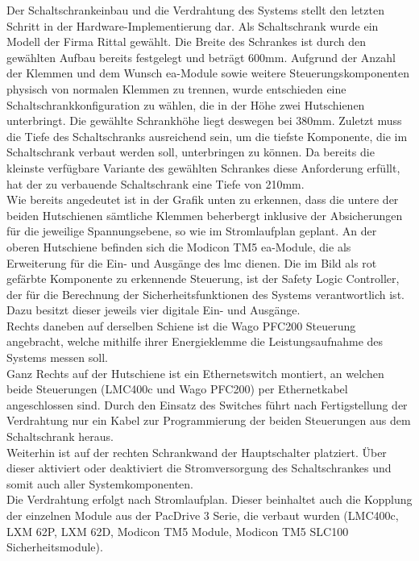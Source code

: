 \documentclass[../../../Bachelorarbeit.tex]{subfiles}
\begin{document}
Der Schaltschrankeinbau und die Verdrahtung des Systems stellt den letzten Schritt in der Hardware-Implementierung dar. Als Schaltschrank wurde ein Modell der Firma Rittal gewählt. Die Breite des Schrankes ist durch den gewählten Aufbau bereits festgelegt und beträgt 600\si{\mm}. Aufgrund der Anzahl der Klemmen und dem Wunsch \acs{ea}-Module sowie weitere Steuerungskomponenten physisch von normalen Klemmen zu trennen, wurde entschieden eine Schaltschrankkonfiguration zu wählen, die in der Höhe zwei Hutschienen unterbringt. Die gewählte Schrankhöhe liegt deswegen bei 380\si{\mm}. Zuletzt muss die Tiefe des Schaltschranks ausreichend sein, um die tiefste Komponente, die im Schaltschrank verbaut werden soll, unterbringen zu können. Da bereits die kleinste verfügbare Variante des gewählten Schrankes diese Anforderung erfüllt, hat der zu verbauende Schaltschrank eine Tiefe von 210\si{\mm}.\\
Wie bereits angedeutet ist in der Grafik unten zu erkennen, dass die untere der beiden Hutschienen sämtliche Klemmen beherbergt inklusive der Absicherungen für die jeweilige Spannungsebene, so wie im Stromlaufplan geplant. An der oberen Hutschiene befinden sich die Modicon TM5 \acs{ea}-Module, die als Erweiterung für die Ein- und Ausgänge des \acs{lmc} dienen. Die im Bild als rot gefärbte Komponente zu erkennende Steuerung, ist der Safety Logic Controller, der für die Berechnung der Sicherheitsfunktionen des Systems verantwortlich ist. Dazu besitzt dieser jeweils vier digitale Ein- und Ausgänge.\\
Rechts daneben auf derselben Schiene ist die Wago PFC200 Steuerung angebracht, welche mithilfe ihrer Energieklemme die Leistungsaufnahme des Systems messen soll.\\
Ganz Rechts auf der Hutschiene ist ein Ethernetswitch montiert, an welchen beide Steuerungen (LMC400c und Wago PFC200) per Ethernetkabel angeschlossen sind. Durch den Einsatz des Switches führt nach Fertigstellung der Verdrahtung nur ein Kabel zur Programmierung der beiden Steuerungen aus dem Schaltschrank heraus.\\
Weiterhin ist auf der rechten Schrankwand der Hauptschalter platziert. Über dieser aktiviert oder deaktiviert die Stromversorgung des Schaltschrankes und somit auch aller Systemkomponenten.\\
Die Verdrahtung erfolgt nach Stromlaufplan. Dieser beinhaltet auch die Kopplung der einzelnen Module aus der PacDrive 3 Serie, die verbaut wurden (LMC400c, LXM 62P, LXM 62D, Modicon TM5 Module, Modicon TM5 SLC100 Sicherheitsmodule). 
\end{document}
